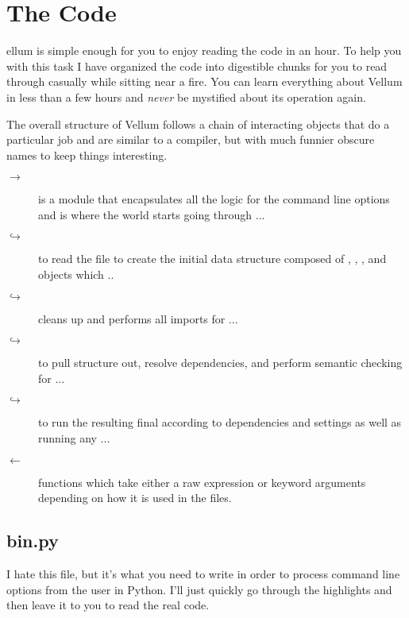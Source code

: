 \appendix


\chapter{The Code}
\label{appendix:Code}

ellum is simple enough for you to enjoy reading the code in an hour.
To help you with this task I have organized the code into digestible chunks for
you to read through casually while sitting near a fire.  You can learn
everything about Vellum in less than a few hours and \emph{never} be mystified
about its operation again.

The overall structure of Vellum follows a chain of interacting objects that do a
particular job and are similar to a compiler, but with much funnier obscure
names to keep things interesting.

\begin{description}
\item[$\rightarrow$]  is a module that encapsulates all the
    logic for the command line options and is where the world starts going
    through ...
\item[$\hookrightarrow$] to read the 
    file to create the initial data structure composed of ,
     , , and  objects which ..
\item[$\hookrightarrow$] cleans up and performs all
    imports for ...
\item[$\hookrightarrow$] to pull structure out, resolve
    dependencies, and perform semantic checking for ...
\item[$\hookrightarrow$] to run the resulting final
     according to dependencies and  settings
    as well as running any ...
\item[$\leftarrow$] functions which take either a raw 
    expression or keyword arguments depending
    on how it is used in the  files.
\end{description}



\section{bin.py}

I hate this file, but it's what you need to write in order to process command
line options from the user in Python.  I'll just quickly go through the
highlights and then leave it to you to read the real code.


